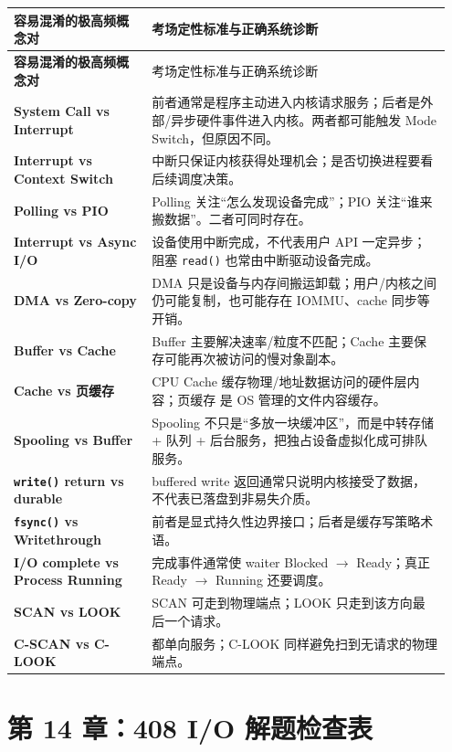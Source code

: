 \documentclass[UTF8,fontset=fandol,11pt,a4paper]{ctexart}
\newcommand{\code}[1]{\texttt{#1}}
\begin{document}
\begingroup
\small
\renewcommand{\arraystretch}{1.25}
\begin{longtable}{>{\bfseries}p{0.3\linewidth} p{0.65\linewidth}}
\toprule
容易混淆的极高频概念对 & 考场定性标准与正确系统诊断 \\
\midrule
\endfirsthead
\toprule
容易混淆的极高频概念对 & 考场定性标准与正确系统诊断 \\
\midrule
\endhead
System Call vs Interrupt & 前者通常是程序主动进入内核请求服务；后者是外部/异步硬件事件进入内核。两者都可能触发 Mode Switch，但原因不同。\\
Interrupt vs Context Switch & 中断只保证内核获得处理机会；是否切换进程要看后续调度决策。\\
Polling vs PIO & Polling 关注“怎么发现设备完成”；PIO 关注“谁来搬数据”。二者可同时存在。\\
Interrupt vs Async I/O & 设备使用中断完成，不代表用户 API 一定异步；阻塞 \code{read()} 也常由中断驱动设备完成。\\
DMA vs Zero-copy & DMA 只是设备与内存间搬运卸载；用户/内核之间仍可能复制，也可能存在 IOMMU、cache 同步等开销。\\
Buffer vs Cache & Buffer 主要解决速率/粒度不匹配；Cache 主要保存可能再次被访问的慢对象副本。\\
Cache vs 页缓存 & CPU Cache 缓存物理/地址数据访问的硬件层内容；页缓存 是 OS 管理的文件内容缓存。\\
Spooling vs Buffer & Spooling 不只是“多放一块缓冲区”，而是中转存储 + 队列 + 后台服务，把独占设备虚拟化成可排队服务。\\
\code{write()} return vs durable & buffered write 返回通常只说明内核接受了数据，不代表已落盘到非易失介质。\\
\code{fsync()} vs Writethrough & 前者是显式持久性边界接口；后者是缓存写策略术语。\\
I/O complete vs Process Running & 完成事件通常使 waiter Blocked $\rightarrow$ Ready；真正 Ready $\rightarrow$ Running 还要调度。\\
SCAN vs LOOK & SCAN 可走到物理端点；LOOK 只走到该方向最后一个请求。\\
C-SCAN vs C-LOOK & 都单向服务；C-LOOK 同样避免扫到无请求的物理端点。\\
\bottomrule
\end{longtable}
\endgroup

\section{第 14 章：408 I/O 解题检查表}
\end{document}
